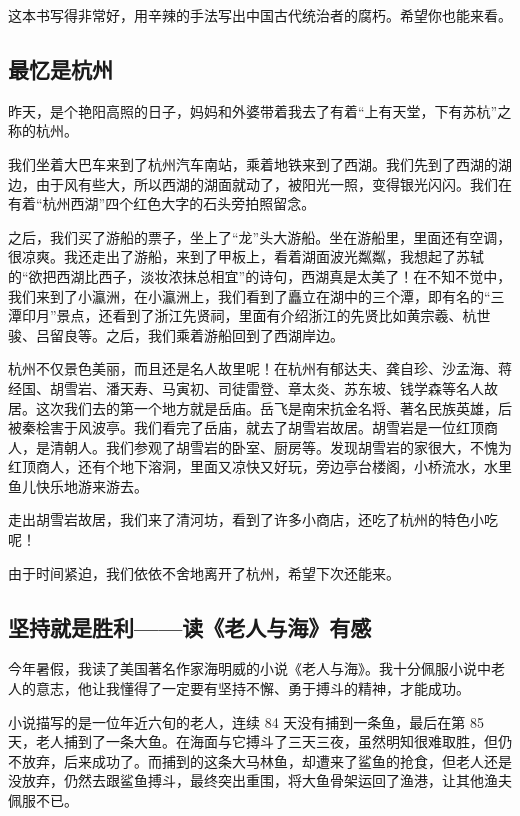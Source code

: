 \documentclass[UTF8,a4paper,titlepage,twoside,10.5pt]{article}
\begin{document}
这本书写得非常好，用辛辣的手法写出中国古代统治者的腐朽。希望你也能来看。

\subsection{最忆是杭州}
\label{sec:org0450dad}

昨天，是个艳阳高照的日子，妈妈和外婆带着我去了有着“上有天堂，下有苏杭”之称的杭州。

我们坐着大巴车来到了杭州汽车南站，乘着地铁来到了西湖。我们先到了西湖的湖边，由于风有些大，所以西湖的湖面就动了，被阳光一照，变得银光闪闪。我们在有着“杭州西湖”四个红色大字的石头旁拍照留念。

之后，我们买了游船的票子，坐上了“龙”头大游船。坐在游船里，里面还有空调，很凉爽。我还走出了游船，来到了甲板上，看着湖面波光粼粼，我想起了苏轼的“欲把西湖比西子，淡妆浓抹总相宜”的诗句，西湖真是太美了！在不知不觉中，我们来到了小瀛洲，在小瀛洲上，我们看到了矗立在湖中的三个潭，即有名的“三潭印月”景点，还看到了浙江先贤祠，里面有介绍浙江的先贤比如黄宗羲、杭世骏、吕留良等。之后，我们乘着游船回到了西湖岸边。

杭州不仅景色美丽，而且还是名人故里呢！在杭州有郁达夫、龚自珍、沙孟海、蒋经国、胡雪岩、潘天寿、马寅初、司徒雷登、章太炎、苏东坡、钱学森等名人故居。这次我们去的第一个地方就是岳庙。岳飞是南宋抗金名将、著名民族英雄，后被秦桧害于风波亭。我们看完了岳庙，就去了胡雪岩故居。胡雪岩是一位红顶商人，是清朝人。我们参观了胡雪岩的卧室、厨房等。发现胡雪岩的家很大，不愧为红顶商人，还有个地下溶洞，里面又凉快又好玩，旁边亭台楼阁，小桥流水，水里鱼儿快乐地游来游去。

走出胡雪岩故居，我们来了清河坊，看到了许多小商店，还吃了杭州的特色小吃呢！

由于时间紧迫，我们依依不舍地离开了杭州，希望下次还能来。

\subsection{坚持就是胜利——读《老人与海》有感}
\label{sec:org7c2a1e9}

今年暑假，我读了美国著名作家海明威的小说《老人与海》。我十分佩服小说中老人的意志，他让我懂得了一定要有坚持不懈、勇于搏斗的精神，才能成功。

小说描写的是一位年近六旬的老人，连续 84 天没有捕到一条鱼，最后在第 85 天，老人捕到了一条大鱼。在海面与它搏斗了三天三夜，虽然明知很难取胜，但仍不放弃，后来成功了。而捕到的这条大马林鱼，却遭来了鲨鱼的抢食，但老人还是没放弃，仍然去跟鲨鱼搏斗，最终突出重围，将大鱼骨架运回了渔港，让其他渔夫佩服不已。
\end{document}

